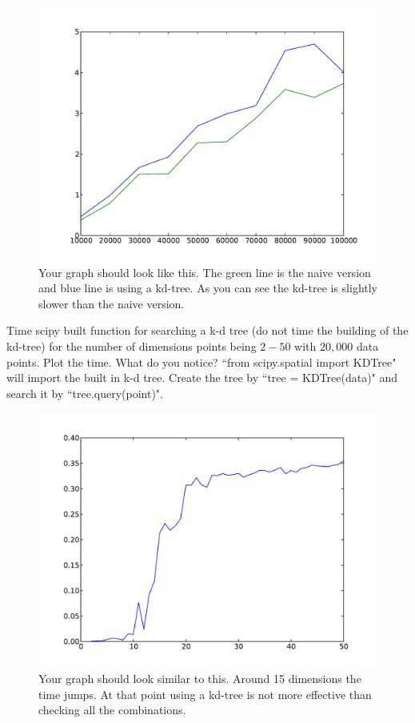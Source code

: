 \begin{figure}[H]
\includegraphics[scale = .5]{20dTime.pdf}
\caption{Your graph should look like this. The green line is the naive version and blue line is using a kd-tree. As you can see the kd-tree is slightly slower than the naive version.}
\end{figure}
\begin{problem}
Time scipy built function for searching a k-d tree (do not time the building of the kd-tree) for the number of dimensions points being $2-50$ with $20,000$ data points. Plot the time. What do you notice? ``from scipy.spatial import KDTree" will import the built in k-d tree. Create the tree by ``tree = KDTree(data)" and search it by ``tree.query(point)".
\end{problem}
\begin{figure}[h!]
\includegraphics[scale = .5]{curseD.pdf}
\caption{Your graph should look similar to this. Around 15 dimensions the time jumps. At that point using a kd-tree is not more effective than checking all the combinations.}
\end{figure}


